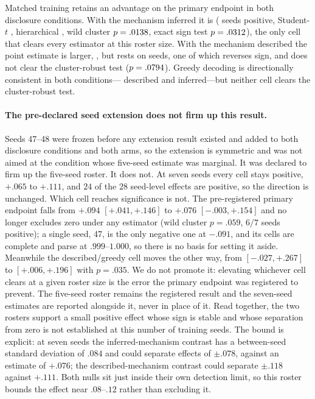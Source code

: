 Matched training retains an advantage on the primary endpoint in both
disclosure conditions. With the mechanism inferred it is
\eShufUndiscStochEst{} (\eShufUndiscStochSign{} seeds positive, Student-$t$
\eShufUndiscStochTci{}, hierarchical \eShufUndiscStochCi{}, wild cluster
$p=.0138{}$, exact sign test $p=.0312{}$),
the only cell that clears every estimator at this roster size. With the mechanism described the
point estimate is larger, \eShufDiscStochEst{} \eShufDiscStochCi{}, but rests
on \eShufDiscStochSign{} seeds, one of which reverses sign, and does not clear
the cluster-robust test ($p=.0794{}$). Greedy decoding is
directionally consistent in both conditions---\eShufDiscGreedyEst{} described
and \eShufUndiscGreedyEst{} inferred---but neither cell clears the
cluster-robust test.

\paragraph{The pre-declared seed extension does not firm up this result.}
Seeds 47--48 were frozen before any extension result existed and added to both
disclosure conditions and both arms, so the extension is symmetric and was not
aimed at the condition whose five-seed estimate was marginal. It was declared
to firm up the five-seed roster. It does not. At seven seeds every cell stays
positive, $+.065$ to $+.111$, and $24$ of the $28$ seed-level effects are
positive, so the direction is unchanged. Which cell reaches significance is
not. The pre-registered primary endpoint falls from $+.094$
$[+.041,+.146]$ to $+.076$ $[-.003,+.154]$ and no longer excludes zero under
any estimator (wild cluster $p=.059$, $6/7$ seeds positive); a single seed, 47,
is the only negative one at $-.091$, and its cells are complete and parse at
$.999$--$1.000$, so there is no basis for setting it aside. Meanwhile the
described/greedy cell moves the other way, from $[-.027,+.267]$ to
$[+.006,+.196]$ with $p=.035$. We do not promote it: elevating whichever cell
clears at a given roster size is the error the primary endpoint was registered
to prevent. The five-seed roster remains the registered result and the
seven-seed estimates are reported alongside it, never in place of it. Read
together, the two rosters support a small positive effect whose sign is stable
and whose separation from zero is not established at this number of training
seeds. The bound is explicit: at seven seeds the inferred-mechanism contrast has
a between-seed standard deviation of $.084$ and could separate effects of
$\pm.078$, against an estimate of $+.076$; the described-mechanism contrast
could separate $\pm.118$ against $+.111$. Both nulls sit just inside their own
detection limit, so this roster bounds the effect near $.08$--$.12$ rather than
excluding it.

